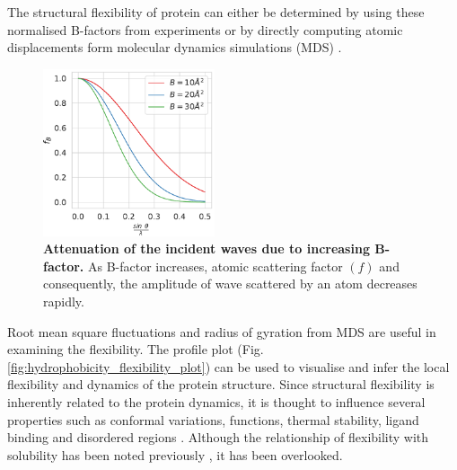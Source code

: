 The structural flexibility of protein can either be determined by using these normalised B-factors from experiments or by directly computing atomic displacements form molecular dynamics simulations (MDS) 
\cite{dong2018structural, kufareva2011methods}. 


\begin{figure}
	\begin{center}
		\includegraphics[width=0.45\textwidth]{chapters/Introduction/Figures/bfactors.pdf}
		\caption[Attenuation of the incident waves due to increasing B-factor.]{\textbf{Attenuation of the incident waves due to increasing B-factor.} As B-factor increases, atomic scattering factor $(f)$ and consequently, the amplitude of wave scattered by an atom decreases rapidly.}%
		\label{fig:bfactors}
	\end{center}
\end{figure}


Root mean square fluctuations and radius of gyration from MDS are useful in examining the flexibility. The profile plot (Fig. \ref{fig:hydrophobicity_flexibility_plot}) can be used to visualise and infer the local flexibility and dynamics of the protein structure. Since structural flexibility is inherently related to the protein dynamics, it is thought to influence several properties such as conformal variations, functions, thermal stability, ligand binding and disordered regions  \cite{Vihinen1987-jo, Teague2003-vq, Ma2005-cr, Yuan2005-gl, Yin2011-su, amaral2017protein}. Although the relationship of flexibility with solubility has been noted previously \cite{Tsumoto2003-qp}, it has been overlooked. 




